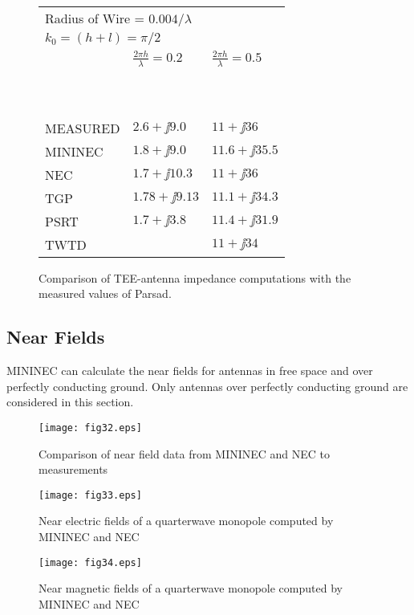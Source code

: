 \documentclass[12pt]{article}
\begin{document}
\clearpage

\begin{figure}[htb]
\begin{tabular}{lll}
\multicolumn{2}{l}{\quad Radius of Wire = $0.004/\lambda$}  \\
\multicolumn{2}{l}{\quad $k_0 = (h + l) = \pi/2$}           \\
         & $\frac{2\pi h}{\lambda}=0.2$ & $\frac{2\pi h}{\lambda}=0.5$ \\
\ \\
\hline
\ \\
MEASURED & $2.6+\jj9.0$                 & $11+\jj36$      \\
MININEC  & $1.8+\jj9.0$                 & $11.6+\jj35.5$  \\
NEC      & $1.7+\jj10.3$                & $11+\jj36$      \\
TGP      & $1.78+\jj9.13$               & $11.1+\jj34.3$  \\
PSRT     & $1.7+\jj3.8$                 & $11.4+\jj31.9$  \\
TWTD     &                              & $11+\jj34$      \\
\end{tabular}
\caption{Comparison of TEE-antenna impedance computations with the
measured values of Parsad.}
\label{fig31}
\end{figure}

\subsection{Near Fields}
MININEC can calculate the near fields for antennas in free space and
over perfectly conducting ground. Only antennas over perfectly
conducting ground are considered in this section.

\begin{figure}[htb]
\centerline{\texttt{[image: fig32.eps]}}
\caption{Comparison of near field data from MININEC and NEC to measurements}
\label{fig32}
\end{figure}

\begin{figure}[htb]
\centerline{\texttt{[image: fig33.eps]}}
\caption{Near electric fields of a quarterwave monopole computed by
MININEC and NEC}
\label{fig33}
\end{figure}

\begin{figure}[htb]
\centerline{\texttt{[image: fig34.eps]}}
\caption{Near magnetic fields of a quarterwave monopole computed by
MININEC and NEC}
\label{fig34}
\end{figure}
\end{document}
